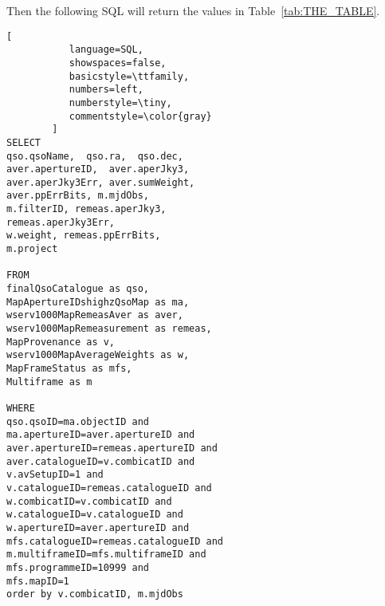 \lstset{upquote=true}

\noindent
Then the following SQL will return the values in
Table~\ref{tab:THE_TABLE}.

\begin{lstlisting}[
           language=SQL,
           showspaces=false,
           basicstyle=\ttfamily,
           numbers=left,
           numberstyle=\tiny,
           commentstyle=\color{gray}
        ]
SELECT 
qso.qsoName,  qso.ra,  qso.dec, 
aver.apertureID,  aver.aperJky3, 
aver.aperJky3Err, aver.sumWeight, 
aver.ppErrBits, m.mjdObs, 
m.filterID, remeas.aperJky3, 
remeas.aperJky3Err, 
w.weight, remeas.ppErrBits, 
m.project

FROM 
finalQsoCatalogue as qso,  
MapApertureIDshighzQsoMap as ma,  
wserv1000MapRemeasAver as aver,  
wserv1000MapRemeasurement as remeas,  
MapProvenance as v,  
wserv1000MapAverageWeights as w, 
MapFrameStatus as mfs, 
Multiframe as m  

WHERE 
qso.qsoID=ma.objectID and 
ma.apertureID=aver.apertureID and 
aver.apertureID=remeas.apertureID and 
aver.catalogueID=v.combicatID and 
v.avSetupID=1 and 
v.catalogueID=remeas.catalogueID and 
w.combicatID=v.combicatID and 
w.catalogueID=v.catalogueID and 
w.apertureID=aver.apertureID and 
mfs.catalogueID=remeas.catalogueID and 
m.multiframeID=mfs.multiframeID and 
mfs.programmeID=10999 and 
mfs.mapID=1 
order by v.combicatID, m.mjdObs
\end{lstlisting}
